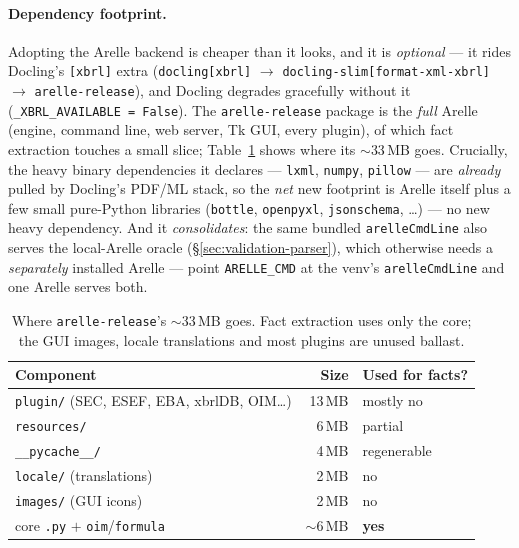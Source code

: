 \documentclass[11pt,a4paper]{report}
\begin{document}
\paragraph{Dependency footprint.} Adopting the Arelle backend is cheaper than it looks, and it is
\emph{optional} --- it rides Docling's \texttt{[xbrl]} extra (\texttt{docling[xbrl]} \(\to\)
\texttt{docling-slim[format-xml-xbrl]} \(\to\) \texttt{arelle-release}), and Docling degrades gracefully
without it (\texttt{\_XBRL\_AVAILABLE = False}). The \texttt{arelle-release} package is the \emph{full} Arelle
(engine, command line, web server, Tk GUI, every plugin), of which fact extraction touches a small slice;
Table~\ref{tab:arelle-footprint} shows where its \(\sim\)33\,MB goes. Crucially, the heavy binary dependencies
it declares --- \texttt{lxml}, \texttt{numpy}, \texttt{pillow} --- are \emph{already} pulled by Docling's
PDF/ML stack, so the \emph{net} new footprint is Arelle itself plus a few small pure-Python libraries
(\texttt{bottle}, \texttt{openpyxl}, \texttt{jsonschema}, \ldots) --- no new heavy dependency. And it
\emph{consolidates}: the same bundled \texttt{arelleCmdLine} also serves the local-Arelle oracle
(\S\ref{sec:validation-parser}), which otherwise needs a \emph{separately} installed Arelle --- point
\texttt{ARELLE\_CMD} at the venv's \texttt{arelleCmdLine} and one Arelle serves both.

\begin{table}[h]
\centering\small
\caption{Where \texttt{arelle-release}'s \(\sim\)33\,MB goes. Fact extraction uses only the core; the GUI
images, locale translations and most plugins are unused ballast.}
\label{tab:arelle-footprint}
\begin{tabular}{@{}lrl@{}}
\toprule
\textbf{Component} & \textbf{Size} & \textbf{Used for facts?} \\
\midrule
\texttt{plugin/} \small(SEC, ESEF, EBA, xbrlDB, OIM\ldots) & 13\,MB & mostly no \\
\texttt{resources/} & 6\,MB & partial \\
\texttt{\_\_pycache\_\_/} & 4\,MB & regenerable \\
\texttt{locale/} \small(translations) & 2\,MB & no \\
\texttt{images/} \small(GUI icons) & 2\,MB & no \\
core \texttt{.py} $+$ \texttt{oim}/\texttt{formula} & \(\sim\)6\,MB & \textbf{yes} \\
\bottomrule
\end{tabular}
\end{table}
\end{document}
